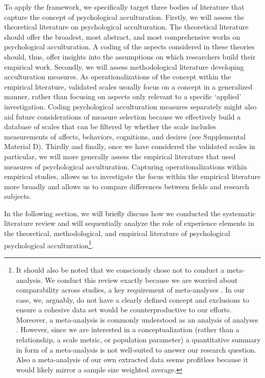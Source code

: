 \documentclass[man, 12pt, a4paper, mask]{apa7}
\begin{document}
To apply the framework, we specifically target three bodies of literature that capture the concept of psychological acculturation. Firstly, we will assess the theoretical literature on psychological acculturation. The theoretical literature should offer the broadest, most abstract, and most comprehensive works on psychological acculturation. A coding of the aspects considered in these theories should, thus, offer insights into the assumptions on which researchers build their empirical work.
Secondly, we will assess methodological literature developing acculturation measures. As operationalizations of the concept within the empirical literature, validated scales usually focus on a concept in a generalized manner, rather than focusing on aspects only relevant to a specific `applied' investigation. Coding psychological acculturation measures separately might also aid future considerations of measure selection because we effectively build a database of scales that can be filtered by whether the scale includes measurements of affects, behaviors, cognitions, and desires (see Supplemental Material D). 
Thirdly and finally, once we have considered the validated scales in particular, we will more generally assess the empirical literature that used measures of psychological acculturation. Capturing operationalizations within empirical studies, allows us to investigate the focus within the empirical literature more broadly and allows us to compare differences between fields and research subjects.

In the following section, we will briefly discuss how we conducted the systematic literature review and will sequentially analyze the role of experience elements in the theoretical, methodological, and empirical literature of psychological psychological acculturation\footnote{It should also be noted that we consciously chose not to conduct a meta-analysis. We conduct this review exactly because we are worried about comparability across studies, a key requirement of meta-analyses \citep{Pogue1998}. In our case, we, arguably, do not have a clearly defined concept and exclusions to ensure a cohesive data set would be counterproductive to our efforts. Moreover, a meta-analysis is commonly understood as an analysis of analyses \citep{Glass1976}. However, since we are interested in a conceptualization (rather than a relationship, a scale metric, or population parameter) a quantitative summary in form of a meta-analysis is not well-suited to answer our research question. Also a meta-analysis of our own extracted data seems profitless because it would likely mirror a sample size weighted average.}.
\end{document}
